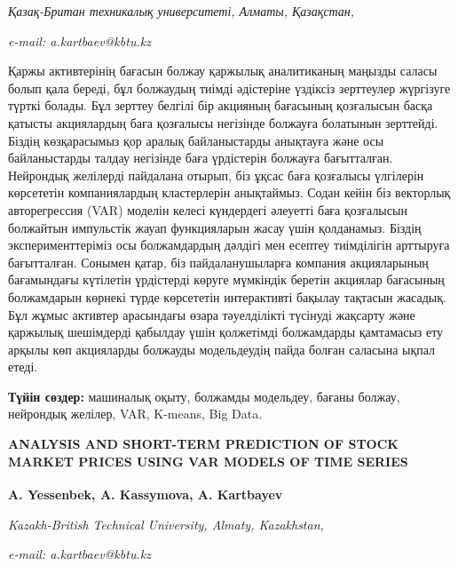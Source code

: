\begin{affiliation}
\emph{Қазақ-Британ техникалық университеті, Алматы, Қазақстан,}

\emph{e-mail: a.kartbaev@kbtu.kz}
\end{affiliation}

Қаржы активтерінің бағасын болжау қаржылық аналитиканың маңызды саласы
болып қала береді, бұл болжаудың тиімді әдістеріне үздіксіз зерттеулер
жүргізуге түрткі болады. Бұл зерттеу белгілі бір акцияның бағасының
қозғалысын басқа қатысты акциялардың баға қозғалысы негізінде болжауға
болатынын зерттейді. Біздің көзқарасымыз қор аралық байланыстарды
анықтауға және осы байланыстарды талдау негізінде баға үрдістерін
болжауға бағытталған. Нейрондық желілерді пайдалана отырып, біз ұқсас
баға қозғалысы үлгілерін көрсететін компаниялардың кластерлерін
анықтаймыз. Содан кейін біз векторлық авторегрессия (VAR) моделін келесі
күндердегі әлеуетті баға қозғалысын болжайтын импульстік жауап
функцияларын жасау үшін қолданамыз. Біздің эксперименттеріміз осы
болжамдардың дәлдігі мен есептеу тиімділігін арттыруға бағытталған.
Сонымен қатар, біз пайдаланушыларға компания акцияларының бағамындағы
күтілетін үрдістерді көруге мүмкіндік беретін акциялар бағасының
болжамдарын көрнекі түрде көрсететін интерактивті бақылау тақтасын
жасадық. Бұл жұмыс активтер арасындағы өзара тәуелділікті түсінуді
жақсарту және қаржылық шешімдерді қабылдау үшін қолжетімді болжамдарды
қамтамасыз ету арқылы көп акцияларды болжауды модельдеудің пайда болған
саласына ықпал етеді.

{\bfseries Түйін сөздер:} машиналық оқыту, болжамды модельдеу, бағаны
болжау, нейрондық желілер, VAR, K-means, Big Data\emph{.}

\begin{articleheader}
{\bfseries ANALYSIS AND SHORT-TERM PREDICTION OF STOCK MARKET PRICES USING VAR MODELS OF TIME SERIES}

{\bfseries
A. Yessenbek,
A. Kassymova,
A. Kartbayev\textsuperscript{\envelope }}
\end{articleheader}

\begin{affiliation}
\emph{Kazakh-British Technical University, Almaty, Kazakhstan,}

\emph{e-mail: a.kartbaev@kbtu.kz}
\end{affiliation}

